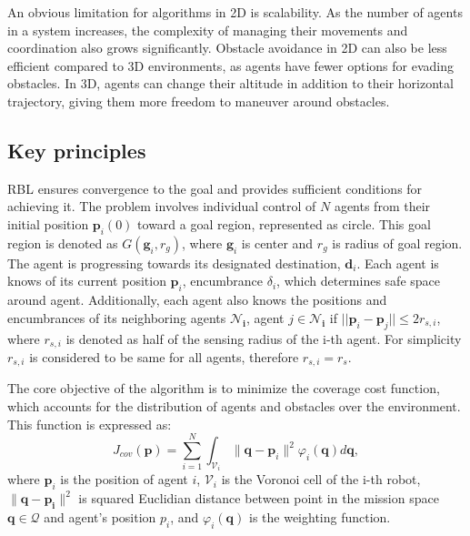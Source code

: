         An obvious limitation for algorithms in 2D is scalability. 
        As the number of agents in a system increases, the complexity of managing their movements and coordination also grows significantly.
        Obstacle avoidance in 2D can also be less efficient compared to 3D environments, as agents have fewer options for evading obstacles. 
        In 3D, agents can change their altitude in addition to their horizontal trajectory, giving them more freedom to maneuver around obstacles.

    \subsection{Key principles}
        RBL ensures convergence to the goal and provides sufficient conditions for achieving it. 
        The problem involves individual control of $N$ agents from their initial position $\mathbf{p}_i(0)$ toward a goal region, represented as circle.
        This goal region is denoted as $G(\mathbf{g}_i, r_g)$, where $\mathbf{g}_i$ is center and $r_g$ is radius of goal region. 
        The agent is progressing towards its designated destination, $\mathbf{d}_i$.
        Each agent is knows of its current position $\mathbf{p}_i$, encumbrance $\delta_i$, which determines safe space around agent.
        Additionally, each agent also knows the positions and encumbrances of its neighboring agents $\mathbf{\mathcal{N}_i}$, agent $j \in \mathbf{\mathcal{N}_i}$ if $||\mathbf{p}_i - \mathbf{p}_j|| \leq 2r_{s,i}$, where $r_{s,i}$ is denoted as half of the sensing radius of the i-th agent.
        For simplicity $r_{s,i}$ is considered to be same for all agents, therefore $r_{s,i} = r_s$. 

        The core objective of the algorithm is to minimize the coverage cost function, which accounts for the distribution of agents and obstacles over the environment. 
        This function is expressed as:
        \begin{equation}
            J_{cov}(\mathbf{p}) = \sum_{i=1}^{N} \int_{\mathcal{V}_i} \lVert\mathbf{q}-\mathbf{p}_i\rVert^2 \varphi_i (\mathbf{q})d\mathbf{q},
            \label{coverage_cost_function}
        \end{equation}
        where $\mathbf{p}_i$ is the position of agent $i$, $\mathcal{V}_i$ is the Voronoi cell of the i-th robot, $\lVert\mathbf{q}-\mathbf{p_i}\rVert^2$ is squared Euclidian distance between point in the mission space $\mathbf{q} \in \mathcal{Q}$ and agent's position $p_i$, 
        and $\varphi_i (\mathbf{q})$ is the weighting function.

